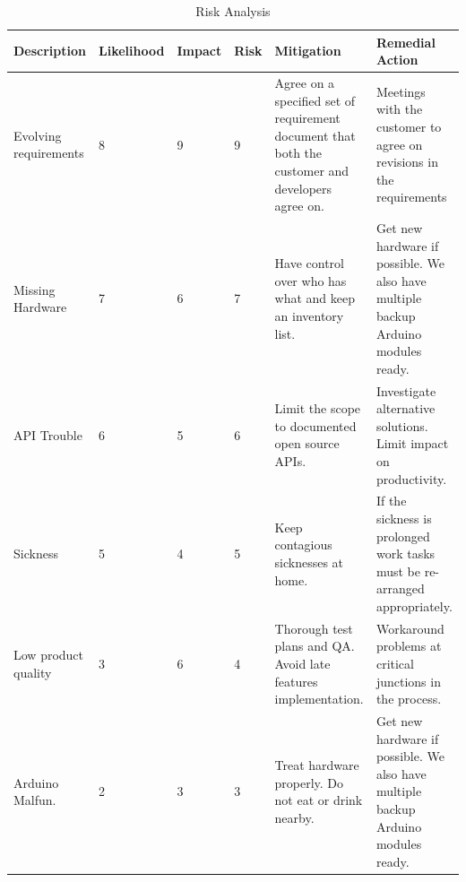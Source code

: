 \begin{table}
	\begin{center}
		\caption{Risk Analysis}
		\begin{tabular}{| p{2.1cm} | l | l | l | p{2.8cm} | p{3cm} |}
		\hline

\textbf{Description} & \textbf{Likelihood} & \textbf{Impact} & \textbf{Risk} & \textbf{Mitigation} & \textbf{Remedial Action}\\ \hline

Evolving requirements	& 8 & 9 & 9 & Agree on a specified set of requirement document that both the customer and developers agree on.
					& Meetings with the customer to agree on revisions in the requirements \\ \hline

Missing Hardware		& 7 & 6 & 7 & Have control over who has what and keep an inventory list.
					& Get new hardware if possible. We also have multiple backup Arduino modules ready. \\ \hline

API Trouble			& 6 & 5 & 6 & Limit the scope to documented open source APIs.
					& Investigate alternative solutions. Limit impact on productivity. \\ \hline

Sickness 			& 5 & 4 & 5 & Keep contagious sicknesses at home.
					& If the sickness is prolonged work tasks must be re-arranged appropriately. \\ \hline

Low product quality		& 3 & 6 & 4 & Thorough test plans  and QA. Avoid late features implementation.
					&  Workaround problems at critical junctions in the process.\\ \hline

Arduino Malfun.		& 2 & 3 & 3 & Treat hardware properly. Do not eat or drink nearby.
					&  Get new hardware if possible. We also have multiple backup Arduino modules ready. \\ \hline


			

		\end{tabular}
	\end{center}	
	\label{table:riskanalysis}
\end{table}

